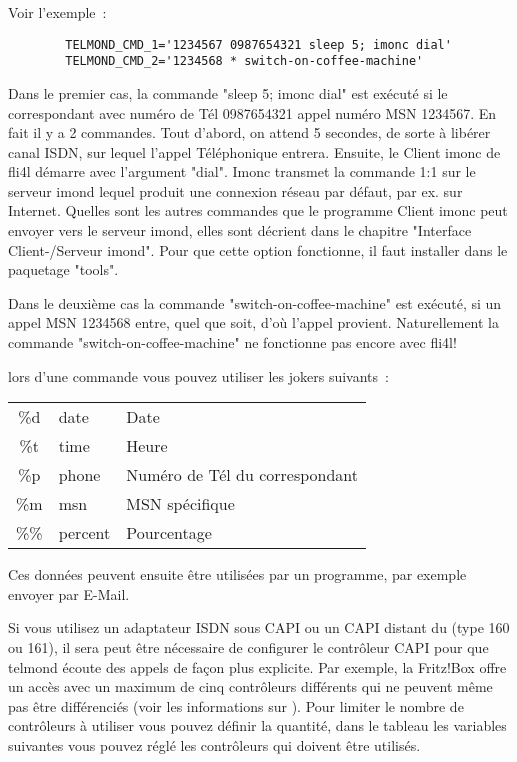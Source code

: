 \begin{description}
  Voir l'exemple~:

\begin{example}
\begin{verbatim}
        TELMOND_CMD_1='1234567 0987654321 sleep 5; imonc dial'
        TELMOND_CMD_2='1234568 * switch-on-coffee-machine'
\end{verbatim}
\end{example}

  Dans le premier cas, la commande "sleep 5; imonc dial" est exécuté si le
  correspondant avec numéro de Tél 0987654321 appel numéro MSN 1234567.
  \-En \-fait il y a 2 commandes. Tout d'abord, on attend 5 secondes, de sorte à
  libérer canal ISDN, sur lequel l'appel Téléphonique entrera. Ensuite, le Client imonc
  de fli4l démarre avec l'argument "dial". Imonc transmet la commande 1:1 sur le
  serveur imond lequel produit une connexion réseau par défaut, par ex. sur Internet.
  Quelles sont les autres commandes que le programme Client imonc peut envoyer
  vers le serveur imond, elles sont décrient dans le chapitre "Interface
  Client-/Serveur imond". Pour que cette option fonctionne, il faut installer
   dans le paquetage "tools".

  Dans le deuxième cas la commande "switch-on-coffee-machine" est exécuté, si un appel
  MSN 1234568 entre, quel que soit, d'où l'appel provient. Na\-turelle\-ment
  la commande "switch-on-coffee-machine" ne fonctionne pas encore avec fli4l!

  lors d'une commande vous pouvez utiliser les jokers suivants~:

  \begin{tabular}[h!]{cll}
  \hline
            \%d   &   date    &    Date \\
            \%t   &   time    &    Heure \\
            \%p   &   phone   &    Numéro de Tél du correspondant \\
            \%m   &   msn     &    MSN spécifique \\
            \%\%  &   percent &    Pourcentage \\
  \end{tabular}

  Ces données peuvent ensuite être utilisées par un programme, par exemple
  envoyer par \mbox{E-Mail}.


  Si vous utilisez un adaptateur ISDN sous CAPI ou un CAPI distant du
  (type 160 ou 161), il sera peut être nécessaire de configurer le contrôleur
  CAPI pour que telmond écoute des appels de façon plus explicite. Par exemple,
  la Fritz!Box offre un accès avec un maximum de cinq contrôleurs différents
  qui ne peuvent même pas être différenciés (voir les informations sur
  ).
  Pour limiter le nombre de contrôleurs à utiliser vous pouvez définir la quantité,
  dans le tableau les variables suivantes  vous
  pouvez réglé les contrôleurs qui doivent être utilisés.


\end{description}
